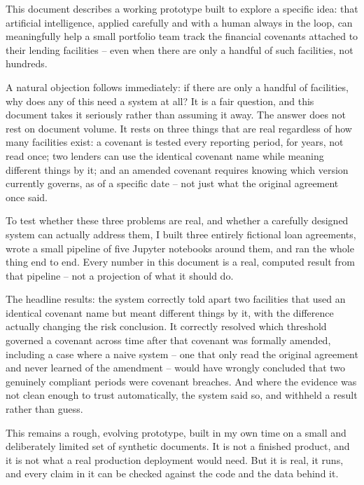 \documentclass[11pt,a4paper]{article}
\begin{document}
This document describes a working prototype built to explore a specific idea: that artificial intelligence, applied carefully and with a human always in the loop, can meaningfully help a small portfolio team track the financial covenants attached to their lending facilities -- even when there are only a handful of such facilities, not hundreds.

A natural objection follows immediately: if there are only a handful of facilities, why does any of this need a system at all? It is a fair question, and this document takes it seriously rather than assuming it away. The answer does not rest on document volume. It rests on three things that are real regardless of how many facilities exist: a covenant is tested every reporting period, for years, not read once; two lenders can use the identical covenant name while meaning different things by it; and an amended covenant requires knowing which version currently governs, as of a specific date -- not just what the original agreement once said.

To test whether these three problems are real, and whether a carefully designed system can actually address them, I built three entirely fictional loan agreements, wrote a small pipeline of five Jupyter notebooks around them, and ran the whole thing end to end. Every number in this document is a real, computed result from that pipeline -- not a projection of what it should do.

The headline results: the system correctly told apart two facilities that used an identical covenant name but meant different things by it, with the difference actually changing the risk conclusion. It correctly resolved which threshold governed a covenant across time after that covenant was formally amended, including a case where a naive system -- one that only read the original agreement and never learned of the amendment -- would have wrongly concluded that two genuinely compliant periods were covenant breaches. And where the evidence was not clean enough to trust automatically, the system said so, and withheld a result rather than guess.

This remains a rough, evolving prototype, built in my own time on a small and deliberately limited set of synthetic documents. It is not a finished product, and it is not what a real production deployment would need. But it is real, it runs, and every claim in it can be checked against the code and the data behind it.

\newpage
\tableofcontents
\newpage
\end{document}
